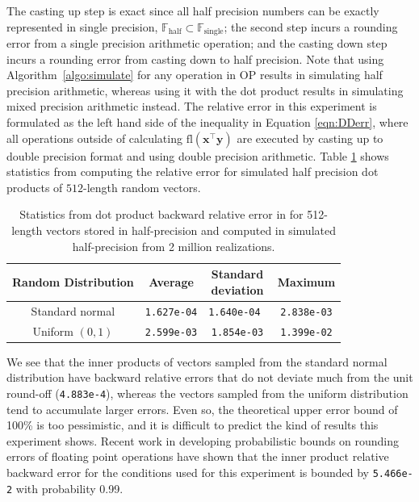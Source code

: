 \documentclass[review,onefignum,onetabnum]{siamart190516}
\newcommand{\F}{\mathbb{F}}
\newcommand{\bb}[1]{\mathbf{#1}}
\newcommand{\fl}{\mathrm{fl}}
\begin{document}
The casting up step is exact since all half precision numbers can be exactly represented in single precision, $\F_{\text{half}}\subset \F_{\text{single}}$; the second step incurs a rounding error from a single precision arithmetic operation; and the casting down step incurs a rounding error from casting down to half precision.
Note that using Algorithm~\ref{algo:simulate} for any operation in OP results in simulating half precision arithmetic, whereas using it with the dot product results in simulating mixed precision arithmetic instead. 
The relative error in this experiment is formulated as the left hand side of the inequality in Equation \ref{eqn:DDerr}, where all operations outside of calculating $\fl(\bb{x}^{\top}\bb{y})$ are executed by casting up to double precision format and using double precision arithmetic.
Table \ref{table:HPdoterr} shows statistics from computing the relative error for simulated half precision dot products of $512$-length random vectors. 
\begin{table}[h]
	\centering
	\begin{tabular}{||c|c|c|c||} 
		\hline
		Random Distribution & Average & \makecell{Standard\\deviation}& Maximum\\ \hline
		Standard normal &{\tt 1.627e-04} & {\tt 1.640e-04 } & {\tt 2.838e-03}\\ \hline
		Uniform $(0,1)$ & {\tt 2.599e-03}& {\tt 1.854e-03} & {\tt 1.399e-02}\\ \hline
	\end{tabular}
	\caption{Statistics from dot product backward relative error in for 512-length vectors stored in half-precision and computed in simulated half-precision from 2 million realizations.}
	\label{table:HPdoterr}
\end{table}
We see that the inner products of vectors sampled from the standard normal distribution have backward relative errors that do not deviate much from the unit round-off ({\tt 4.883e-4}), whereas the vectors sampled from the uniform distribution tend to accumulate larger errors. 
Even so, the theoretical upper error bound of 100\% is too pessimistic, and it is difficult to predict the kind of results this experiment shows. 
Recent work in developing probabilistic bounds on rounding errors of floating point operations have shown that the inner product relative backward error for the conditions used for this experiment is bounded by {\tt 5.466e-2} with probability 0.99. \par
\end{document}
